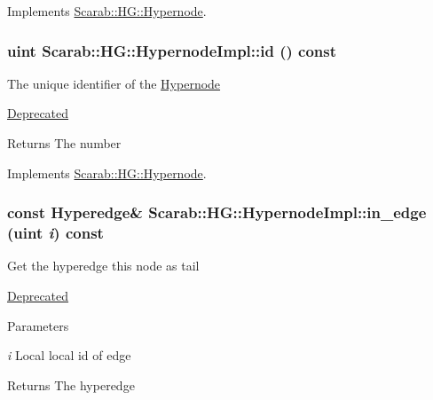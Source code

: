 Implements \hyperlink{class_scarab_1_1_h_g_1_1_hypernode_a3306572ded5b5061c1916bcf268be94e}{Scarab::HG::Hypernode}.

\hypertarget{class_scarab_1_1_h_g_1_1_hypernode_impl_a2579ef1e67ad8f51d23838c130440d21}{
\subsubsection[{id}]{\setlength{\rightskip}{0pt plus 5cm}uint Scarab::HG::HypernodeImpl::id () const}}
\label{class_scarab_1_1_h_g_1_1_hypernode_impl_a2579ef1e67ad8f51d23838c130440d21}
The unique identifier of the \hyperlink{class_scarab_1_1_h_g_1_1_hypernode}{Hypernode} \begin{Desc}
\item[\hyperlink{deprecated__deprecated000006}{Deprecated}]\end{Desc}
\begin{DoxyReturn}{Returns}
The number 
\end{DoxyReturn}


Implements \hyperlink{class_scarab_1_1_h_g_1_1_hypernode_a0aeaee6c2ca2a011fcd086f803aaa4d0}{Scarab::HG::Hypernode}.

\hypertarget{class_scarab_1_1_h_g_1_1_hypernode_impl_a26ff9db30c03c7b74181e9f901aa71d4}{
\subsubsection[{in\_\-edge}]{\setlength{\rightskip}{0pt plus 5cm}const {\bf Hyperedge}\& Scarab::HG::HypernodeImpl::in\_\-edge (uint {\em i}) const}}
\label{class_scarab_1_1_h_g_1_1_hypernode_impl_a26ff9db30c03c7b74181e9f901aa71d4}
Get the hyperedge this node as tail \begin{Desc}
\item[\hyperlink{deprecated__deprecated000010}{Deprecated}]\end{Desc}

\begin{DoxyParams}{Parameters}
\item[{\em i}]Local local id of edge\end{DoxyParams}
\begin{DoxyReturn}{Returns}
The hyperedge 
\end{DoxyReturn}


